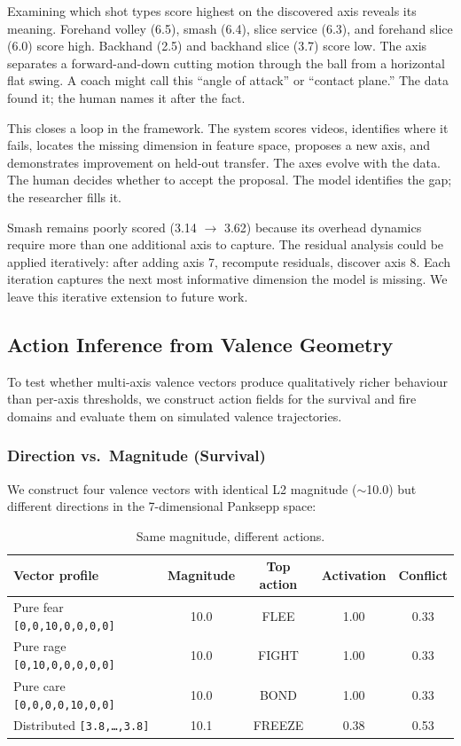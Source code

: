 \documentclass[11pt]{article}
\begin{document}
Examining which shot types score highest on the discovered axis reveals its meaning. Forehand volley (6.5), smash (6.4), slice service (6.3), and forehand slice (6.0) score high. Backhand (2.5) and backhand slice (3.7) score low. The axis separates a forward-and-down cutting motion through the ball from a horizontal flat swing. A coach might call this ``angle of attack'' or ``contact plane.'' The data found it; the human names it after the fact.

This closes a loop in the framework. The system scores videos, identifies where it fails, locates the missing dimension in feature space, proposes a new axis, and demonstrates improvement on held-out transfer. The axes evolve with the data. The human decides whether to accept the proposal. The model identifies the gap; the researcher fills it.

Smash remains poorly scored (3.14 $\to$ 3.62) because its overhead dynamics require more than one additional axis to capture. The residual analysis could be applied iteratively: after adding axis 7, recompute residuals, discover axis 8. Each iteration captures the next most informative dimension the model is missing. We leave this iterative extension to future work.

\subsection{Action Inference from Valence Geometry}

To test whether multi-axis valence vectors produce qualitatively richer behaviour than per-axis thresholds, we construct action fields for the survival and fire domains and evaluate them on simulated valence trajectories.

\subsubsection{Direction vs.\ Magnitude (Survival)}

We construct four valence vectors with identical L2 magnitude ($\sim$10.0) but different directions in the 7-dimensional Panksepp space:

\begin{table}[h]
\centering
\caption{Same magnitude, different actions.}
\label{tab:direction}
\begin{tabular}{lcccc}
\toprule
\textbf{Vector profile} & \textbf{Magnitude} & \textbf{Top action} & \textbf{Activation} & \textbf{Conflict} \\
\midrule
Pure fear \texttt{[0,0,10,0,0,0,0]} & 10.0 & FLEE & 1.00 & 0.33 \\
Pure rage \texttt{[0,10,0,0,0,0,0]} & 10.0 & FIGHT & 1.00 & 0.33 \\
Pure care \texttt{[0,0,0,0,10,0,0]} & 10.0 & BOND & 1.00 & 0.33 \\
Distributed \texttt{[3.8,\ldots,3.8]} & 10.1 & FREEZE & 0.38 & 0.53 \\
\bottomrule
\end{tabular}
\end{table}
\end{document}
